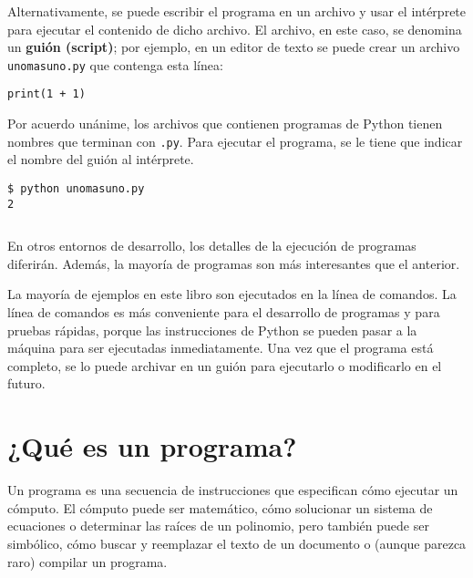Alternativamente, se puede escribir el programa en un archivo y usar
el intérprete para ejecutar el contenido de dicho archivo. El archivo,
en este caso, se denomina un \textbf{guión (script)}; por ejemplo,
en un editor de texto se puede crear un archivo \texttt{unomasuno.py}
que contenga esta línea:

\begin{lstlisting}
print(1 + 1)
\end{lstlisting}

Por acuerdo unánime, los archivos que contienen programas de Python
tienen nombres que terminan con \texttt{.py}. Para ejecutar el programa,
se le tiene que indicar el nombre del guión al intérprete.

\begin{lstlisting}
$ python unomasuno.py
2
\end{lstlisting}
\begin{verbatim}

\end{verbatim}
En otros entornos de desarrollo, los detalles de la ejecución de programas
diferirán. Además, la mayoría de programas son más interesantes que
el anterior.

La mayoría de ejemplos en este libro son ejecutados en la línea de
comandos. La línea de comandos es más conveniente para el desarrollo
de programas y para pruebas rápidas, porque las instrucciones de Python
se pueden pasar a la máquina para ser ejecutadas inmediatamente. Una
vez que el programa está completo, se lo puede archivar en un guión
para ejecutarlo o modificarlo en el futuro.

\section{¿Qué es un programa?}

Un programa es una secuencia de instrucciones que especifican cómo
ejecutar un cómputo. El cómputo puede ser matemático, cómo solucionar
un sistema de ecuaciones o determinar las raíces de un polinomio,
pero también puede ser simbólico, cómo buscar y reemplazar el texto
de un documento o (aunque parezca raro) compilar un programa.


